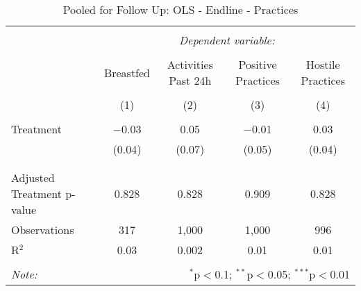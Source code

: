 
\begin{table}[!htbp] \centering 
  \caption{Pooled for Follow Up: OLS - Endline - Practices} 
  \label{tbl:Pooled for Follow Up: OLS - Endline - Practices} 
\begin{tabular}{@{\extracolsep{5pt}}lcccc} 
\\[-1.8ex]\hline 
\hline \\[-1.8ex] 
 & \multicolumn{4}{c}{\textit{Dependent variable:}} \\ 
\cline{2-5} 
\\[-1.8ex] & Breastfed & Activities Past 24h & Positive Practices & Hostile Practices \\ 
\\[-1.8ex] & (1) & (2) & (3) & (4)\\ 
\hline \\[-1.8ex] 
 Treatment & $-$0.03 & 0.05 & $-$0.01 & 0.03 \\ 
  & (0.04) & (0.07) & (0.05) & (0.04) \\ 
  & & & & \\ 
\hline \\[-1.8ex] 
Adjusted Treatment p-value & 0.828 & 0.828 & 0.909 & 0.828 \\ 
Observations & 317 & 1,000 & 1,000 & 996 \\ 
R$^{2}$ & 0.03 & 0.002 & 0.01 & 0.01 \\ 
\hline 
\hline \\[-1.8ex] 
\textit{Note:}  & \multicolumn{4}{r}{$^{*}$p$<$0.1; $^{**}$p$<$0.05; $^{***}$p$<$0.01} \\ 
\end{tabular} 
\end{table} 
